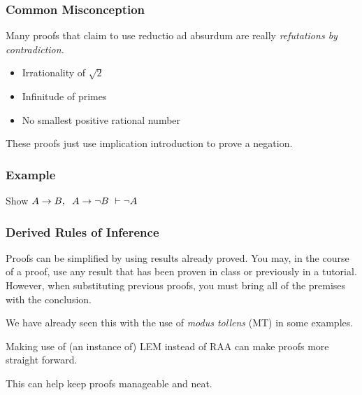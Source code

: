 \documentclass{beamer}
\theoremstyle{indentDefn} \newtheorem{defn}[]{Definition}
\begin{document}
\begin{frame}
	\frametitle{Common Misconception}

	Many proofs that claim to use reductio ad absurdum are really \emph{refutations by contradiction.}

	\begin{itemize}
		\item Irrationality of $\sqrt{2}$
		\item Infinitude of primes
		\item No smallest positive rational number
	\end{itemize}

	\vspace{3cm}

	These proofs just use implication introduction to prove a negation. 

\end{frame}

\begin{frame}
	\frametitle{Example}
	Show $A \rightarrow B, \hspace{0.2cm} A \rightarrow \lnot B \ \vdash \lnot A$
	\vspace{7cm}
	
	
	
\end{frame}



\begin{frame}
	\frametitle{Derived Rules of Inference}
	
	Proofs can be simplified by using results already proved. You may, in the course of a proof, use any result that has been proven in class or previously in a tutorial. However, when substituting previous proofs, you must bring all of the premises with the conclusion. 
	
	\vspace{0.5cm}
	
	We have already seen this with the use of \emph{modus tollens} (MT) in some examples.
	
	\vspace{0.5cm} 
	
	Making use of (an instance of) LEM instead of RAA can make proofs more straight forward. 

	\vspace{0.5cm}

	This can help keep proofs manageable and neat. 

\end{frame}
\end{document}
